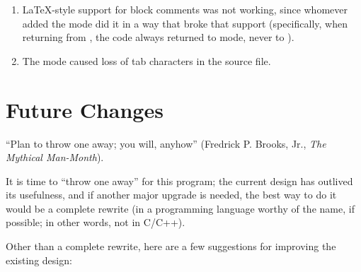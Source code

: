 \documentclass[twoside,12pt]{article}
\begin{document}
\begin{enumerate}
\item
LaTeX-style support for block comments was not working, since whomever added the
    \PROGfb{} mode did it in a way that broke that support (specifically, when
    returning from \PROGfc{}, the code always returned to \PROGfd{} mode,
    never to \PROGfe{}).

\item
The \PROGff{} mode caused loss of tab characters in the source file.

\end{enumerate}

\section{Future Changes}
\label{Section:Future:Changes}

``Plan to throw one away; you will, anyhow'' (Fredrick P. Brooks, Jr., \emph{The Mythical
    Man-Month}).

It is time to ``throw one away'' for this program; the current design has outlived its
    usefulness, and if another major upgrade is needed, the best way to do it would be
    a complete rewrite (in a programming language worthy of the name, if possible; in
    other words, not in C/C++).

Other than a complete rewrite, here are a few suggestions for improving the existing design:
\end{document}
